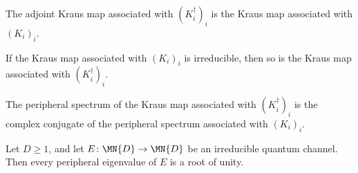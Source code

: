 \begin{theorem}%
    \label{thm:adjoint_map_conjtranspose_family}
    \leanok
    The adjoint Kraus map associated with $(K_i^\dagger)_i$ is the Kraus map
    associated with $(K_i)_i$.
\end{theorem}

\begin{theorem}%
    \label{thm:irreducible_conjtranspose_family}
    \leanok
    If the Kraus map associated with $(K_i)_i$ is irreducible, then so is the
    Kraus map associated with $(K_i^\dagger)_i$.
\end{theorem}

\begin{theorem}%
    \label{thm:peripheral_conjtranspose_family}
    \leanok
    The peripheral spectrum of the Kraus map associated with $(K_i^\dagger)_i$
    is the complex conjugate of the peripheral spectrum associated with
    $(K_i)_i$.
\end{theorem}

\begin{theorem}%
    \label{thm:peripheral_roots_irreducible_channel}
    \leanok
    Let $D\geq1$, and let $E\colon\MN{D}\to\MN{D}$ be an irreducible quantum
    channel. Then every peripheral eigenvalue of $E$ is a root of unity.
\end{theorem}

